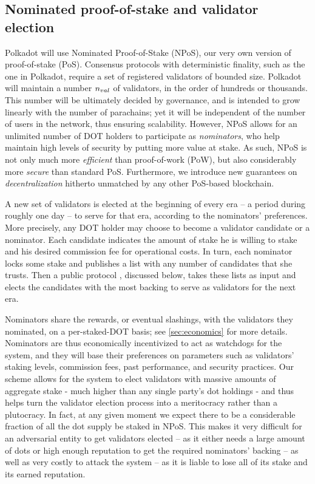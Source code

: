 \subsection{Nominated proof-of-stake and validator election}\label{sec:validators}
Polkadot will use Nominated Proof-of-Stake (NPoS), our very own version of proof-of-stake (PoS).
Consensus protocols with deterministic finality, such as the one in Polkadot, 
require a set of registered validators of bounded size.
Polkadot will maintain a number $n_{val}$ of validators, in the order of hundreds or thousands.
This number will be ultimately decided by governance, and is intended to grow linearly with the number of parachains;
yet it will be independent of the number of users in the network, thus ensuring scalability.
However, NPoS allows for an unlimited number of DOT holders to participate as \emph{nominators},
who help maintain high levels of security by putting more value at stake.
As such, NPoS is not only much more \emph{efficient} than proof-of-work (PoW),
but also considerably more \emph{secure} than standard PoS.
Furthermore, we introduce new guarantees on \emph{decentralization} hitherto unmatched by any other PoS-based blockchain.

A new set of validators is elected at the beginning of every era -- a period during roughly one day --
to serve for that era, according to the nominators' preferences.
More precisely, any DOT holder may choose to become a validator candidate or a nominator.
Each candidate indicates the amount of stake he is willing to stake and his desired commission fee for operational costs.
In turn, each nominator locks some stake and publishes a list with any number of candidates that she trusts.
Then a public protocol , discussed below, takes these lists as input and elects the candidates
with the most backing to serve as validators for the next era.

Nominators share the rewards, or eventual slashings, with the validators they nominated, on a per-staked-DOT basis; 
see \autoref{sec:economics} for more details. 
Nominators are thus economically incentivized to act as watchdogs for the system, and they will base their preferences 
on parameters such as validators' staking levels, commission fees, past performance, and security practices.
Our scheme allows for the system to elect validators with massive amounts of aggregate stake
- much higher than any single party's dot holdings -
and thus helps turn the validator election process into a meritocracy rather than a plutocracy.
In fact, at any given moment we expect there to be a considerable fraction of all the dot supply be staked in NPoS.
This makes it very difficult for an adversarial entity to get validators elected 
-- as it either needs a large amount of dots or high enough reputation to get the required nominators' backing -- 
as well as very costly to attack the system -- as it is liable to lose all of its stake and its earned reputation.

